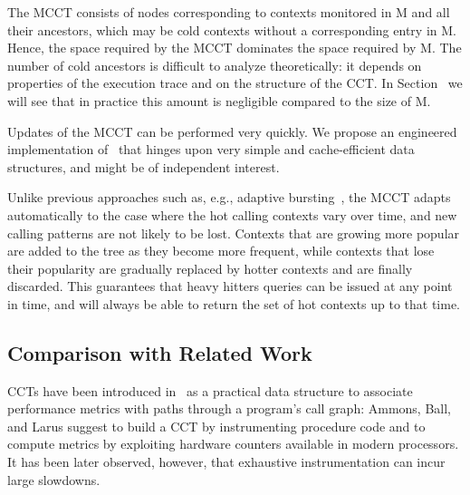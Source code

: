 The MCCT consists of nodes corresponding to contexts monitored in M and all their ancestors, which may be cold contexts without a corresponding entry in M. Hence, the space required by the MCCT dominates the space required by M. The number of cold ancestors is difficult to analyze theoretically: it depends on properties of the execution trace and on the structure of the CCT. In Section \missing\ we will see that in practice this amount is negligible compared to the size of M.

Updates of the MCCT can be performed very quickly. We propose an engineered implementation of \spacesaving\ that hinges upon very simple and cache-efficient data structures, and might be of independent interest.

Unlike previous approaches such as, e.g., adaptive bursting~\cite{Zhuang06}, the MCCT adapts automatically to the case where the hot calling contexts vary over time, and new calling patterns are not likely to be lost. Contexts that are growing more popular are added to the tree as they become more frequent, while contexts that lose their popularity are gradually replaced by hotter contexts and are finally discarded. This guarantees that heavy hitters queries can be issued at any point in time, and will always be able to return the set of hot contexts up to that time.



\subsection{Comparison with Related Work}

CCTs have been introduced in~\cite{Ammons97} as a practical data structure to associate performance metrics with paths through a program's call graph: Ammons, Ball, and Larus suggest to build a CCT by instrumenting procedure code and to compute metrics by exploiting hardware counters available in modern processors. It has been later observed, however, that exhaustive instrumentation can incur large slowdowns.

